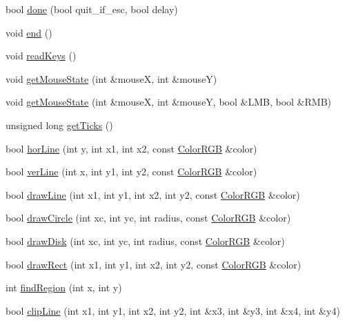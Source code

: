 \begin{DoxyCompactItemize}
bool \hyperlink{namespaceQuickCG_aa67a7a5cf114a4cdd48b9d76645aedbb}{done} (bool quit\-\_\-if\-\_\-esc, bool delay)
\item 
void \hyperlink{namespaceQuickCG_a3f2f6f46ae7da8905177080c7a6697bb}{end} ()
\item 
void \hyperlink{namespaceQuickCG_a9c9bf2da1e2577f8143f828525be7de1}{read\-Keys} ()
\item 
void \hyperlink{namespaceQuickCG_a5ea3f31f493e54c0640735580000787f}{get\-Mouse\-State} (int \&mouse\-X, int \&mouse\-Y)
\item 
void \hyperlink{namespaceQuickCG_a5ebca8699dfd7a607931e4d648534a2b}{get\-Mouse\-State} (int \&mouse\-X, int \&mouse\-Y, bool \&L\-M\-B, bool \&R\-M\-B)
\item 
unsigned long \hyperlink{namespaceQuickCG_a83e125bfed1df906c2e65690780c02f9}{get\-Ticks} ()
\item 
bool \hyperlink{namespaceQuickCG_a49f1bead8769fec578f753ee9484a4a7}{hor\-Line} (int y, int x1, int x2, const \hyperlink{structQuickCG_1_1ColorRGB}{Color\-R\-G\-B} \&color)
\item 
bool \hyperlink{namespaceQuickCG_a90e37f3314b8241e48379258ddae7870}{ver\-Line} (int x, int y1, int y2, const \hyperlink{structQuickCG_1_1ColorRGB}{Color\-R\-G\-B} \&color)
\item 
bool \hyperlink{namespaceQuickCG_a1d0cad1b7d56d0e72be33e60f1ca35d3}{draw\-Line} (int x1, int y1, int x2, int y2, const \hyperlink{structQuickCG_1_1ColorRGB}{Color\-R\-G\-B} \&color)
\item 
bool \hyperlink{namespaceQuickCG_a208916a2a9a13b0ecd23d0d0056ceb90}{draw\-Circle} (int xc, int yc, int radius, const \hyperlink{structQuickCG_1_1ColorRGB}{Color\-R\-G\-B} \&color)
\item 
bool \hyperlink{namespaceQuickCG_a586900f2d3ea8ed8a6d7e96f53ecdb1d}{draw\-Disk} (int xc, int yc, int radius, const \hyperlink{structQuickCG_1_1ColorRGB}{Color\-R\-G\-B} \&color)
\item 
bool \hyperlink{namespaceQuickCG_ab38d4ebc9445ace135d23e70bedd84a0}{draw\-Rect} (int x1, int y1, int x2, int y2, const \hyperlink{structQuickCG_1_1ColorRGB}{Color\-R\-G\-B} \&color)
\item 
int \hyperlink{namespaceQuickCG_a746be355c06de9c0984428821c354c62}{find\-Region} (int x, int y)
\item 
bool \hyperlink{namespaceQuickCG_afe23902e64e75a0d1219145fb5d9b76c}{clip\-Line} (int x1, int y1, int x2, int y2, int \&x3, int \&y3, int \&x4, int \&y4)
\item 

\end{DoxyCompactItemize}
